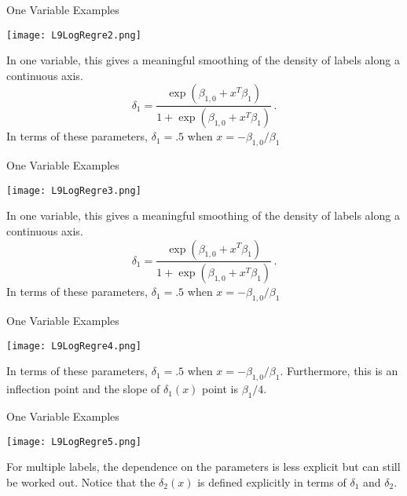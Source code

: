 \documentclass[10pt, table, dvipsnames,xcdraw, handout]{beamer}
\begin{document}
\begin{frame}[fragile]{One Variable Examples}
  \begin{minipage}[t][0.5\textheight][t]{\textwidth}
	\centering \texttt{[image: L9LogRegre2.png]} 
  \end{minipage}
  \vfill
\begin{minipage}[t][0.5\textheight][t]{\textwidth}
In one variable, this gives a meaningful smoothing of the density of labels along a continuous axis. 
$$
\delta_1 = \frac{\exp(\beta_{1,0}+x^T\beta_1)}{1+\exp(\beta_{1,0} + x^T\beta_1)}\,.
$$
In terms of these parameters, $\delta_1 = .5$ when $x = -\beta_{1,0}/\beta_1 $
\end{minipage}
\end{frame}


\begin{frame}[fragile]{One Variable Examples}
  \begin{minipage}[t][0.5\textheight][t]{\textwidth}
	\centering \texttt{[image: L9LogRegre3.png]} 
  \end{minipage}
  \vfill
\begin{minipage}[t][0.5\textheight][t]{\textwidth}
In one variable, this gives a meaningful smoothing of the density of labels along a continuous axis. 
$$
\delta_1 = \frac{\exp(\beta_{1,0}+x^T\beta_1)}{1+\exp(\beta_{1,0} + x^T\beta_1)}\,.
$$
In terms of these parameters, $\delta_1 = .5$ when $x = -\beta_{1,0}/\beta_1$
\end{minipage}
\end{frame}



 


\begin{frame}[fragile]{One Variable Examples}
  \begin{minipage}[t][0.5\textheight][t]{\textwidth}
	\centering \texttt{[image: L9LogRegre4.png]} 
  \end{minipage}
  \vfill
\begin{minipage}[t][0.5\textheight][t]{\textwidth}
In terms of these parameters, $\delta_1 = .5$ when $x = -\beta_{1,0}/\beta_1 $. Furthermore, this is an inflection point and the slope of $\delta_1(x)$  point is $\beta_1/4$. 
\end{minipage}
\end{frame}



\begin{frame}[fragile]{One Variable Examples}
  \begin{minipage}[t][0.5\textheight][t]{\textwidth}
	\centering \texttt{[image: L9LogRegre5.png]} 
  \end{minipage}
  \vfill
\begin{minipage}[t][0.5\textheight][t]{\textwidth}
For multiple labels, the dependence on the parameters is less explicit but can still be worked out. Notice that the $\delta_2(x)$ is defined explicitly in terms of $\delta_1$ and $\delta_2$. 
\end{minipage}
\end{frame}
\end{document}

